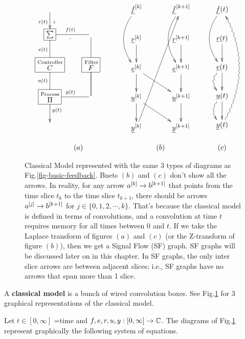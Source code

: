 \begin{figure}[h!]
$$
\begin{array}{ccc}
\xymatrix{
\ar[d]_{r(t)}^{+}
\\
*+[F]{\sum}
\ar@{-}[d]_{e(t)}
&\ar@{-}[l]^{-}_{f(t)}
\\
*+[F]{\stackrel{\rm Controller}{C}}
\ar@{-}[d]_{u(t)}
&
*+[F]{\stackrel{\rm Filter} {F}}
\ar@{-}[u]\ar@{-}[d]
&
\\
*+[F]{\stackrel{\rm Process} {\Pi}}
\ar@{-}[r]^{y(t)}
\ar[d]^{y(t)}
&\ar@{-}[u]
\\
&
}
&
\xymatrix@C=3pc{
\rvf^{[k]}\ar@/_1.5pc/[dd]
&
\rvf^{[k+1]}\ar@/_1.5pc/[dd]
\\
\rvr^{[k]}\ar[d]
&
\rvr^{[k+1]}\ar[d]
\\
\rve^{[k]}\ar[d]\ar[rd]
&
\rve^{[k+1]}\ar[d]
\\
\rvu^{[k]}\ar[d]\ar[rd]
&\rvu^{[k+1]}\ar[d]
\\
\rvy^{[k]}\ar[ruuuu]
&
\rvy^{[k+1]}
}
&\quad\quad
\xymatrix{
\rvf(t)\ar@/_1.5pc/[dd]
\\
\rvr(t)\ar[d]
\\
\rve(t)\ar[d]\ar@{~>}@/_1pc/[d]
\\
\rvu(t)\ar[d]\ar@{~>}@/_1pc/[d]
\\
\rvy(t)\ar@{~>}@/_2pc/[uuuu]
}
\\
\\
(a)& (b) &\quad\quad (c)
\end{array}
$$
\caption{
Classical Model
represented
with
the same 3
types of diagrams
as Fig.\ref{fig-basic-feedback}.
Bnets $(b)$ and $(c)$
don't
show all the arrows.
In reality,
for any arrow $a^{[k]}\rightarrow b^{[k+1]}$ that
points from the 
time slice $t_k$
to the time slice $t_{k+1}$,
there should 
be arrows 
$a^{[j]}\rightarrow b^{[k+1]}$
for $j\in\{0,1,2, \cdots, k
\}$.
That's because
the classical model is defined
in terms of convolutions,
and a convolution
at time $t$ requires
memory for all times
between 0 and $t$.
If we take
the Laplace transform
of figures $(a)$ and $(c)$ (or 
the Z-transform of figure $(b)$),
then we get a
Signal Flow (SF) graph. SF graphs will
be discussed later on in this chapter.
In SF graphs,
the only
inter slice arrows are between 
adjacent slices; i.e., SF graphs have
no arrows that 
span more than 1 slice.}
\label{fig-classic-model}
\end{figure}
A {\bf classical
model} is a bunch of
 wired convolution boxes.
 See Fig.\ref{fig-classic-model}
 for 3
 graphical
 representations of
 the classical model.
 
Let $t\in[0,\infty]$
=time and
$f,e,r,u,y:[0,\infty]\rightarrow { \mathbb{C}}$.
The diagrams of 
Fig.\ref{fig-classic-model}
represent
graphically
the following
system
of equations.


